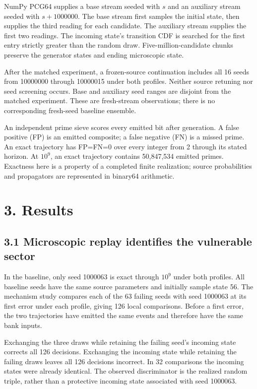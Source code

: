 \documentclass[
  11pt,
]{article}
\begin{document}
NumPy PCG64 supplies a base stream seeded with \(s\) and an auxiliary
stream seeded with \(s+1000000\). The base stream first samples the
initial state, then supplies the third reading for each candidate. The
auxiliary stream supplies the first two readings. The incoming state's
transition CDF is searched for the first entry strictly greater than the
random draw. Five-million-candidate chunks preserve the generator states
and ending microscopic state.

After the matched experiment, a frozen-source continuation includes all
16 seeds from 10000000 through 10000015 under both profiles. Neither
source retuning nor seed screening occurs. Base and auxiliary seed
ranges are disjoint from the matched experiment. These are fresh-stream
observations; there is no corresponding fresh-seed baseline ensemble.

An independent prime sieve scores every emitted bit after generation. A
false positive (FP) is an emitted composite; a false negative (FN) is a
missed prime. An exact trajectory has FP=FN=0 over every integer from 2
through its stated horizon. At \(10^9\), an exact trajectory contains
50,847,534 emitted primes. Exactness here is a property of a completed
finite realization; source probabilities and propagators are represented
in binary64 arithmetic.

\section{3. Results}\label{results}

\subsection{3.1 Microscopic replay identifies the vulnerable
sector}\label{microscopic-replay-identifies-the-vulnerable-sector}

In the baseline, only seed 1000063 is exact through \(10^9\) under both
profiles. All baseline seeds have the same source parameters and
initially sample state 56. The mechanism study compares each of the 63
failing seeds with seed 1000063 at its first error under each profile,
giving 126 local comparisons. Before a first error, the two trajectories
have emitted the same events and therefore have the same bank inputs.

Exchanging the three draws while retaining the failing seed's incoming
state corrects all 126 decisions. Exchanging the incoming state while
retaining the failing draws leaves all 126 decisions incorrect. In 32
comparisons the incoming states were already identical. The observed
discriminator is the realized random triple, rather than a protective
incoming state associated with seed 1000063.
\end{document}
